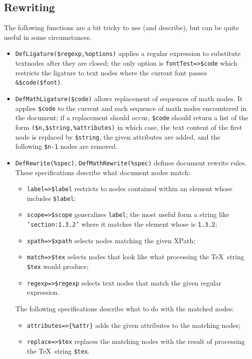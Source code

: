 \documentclass{book}
\begin{document}
\subsection{Rewriting}\label{customization.latexml.rewriting}
The following functions are a bit tricky to use (and describe),
but can be quite useful in some circumstances.
\begin{itemize}
\item \verb|DefLigature($regexp,%options)| applies a regular expression
to substitute textnodes after they are closed; the only option is \verb|fontTest=>$code|
which restricts the ligature to text nodes where the current font passes \verb|&$code($font)|.
\item \verb|DefMathLigature($code)| allows replacement of sequences of math nodes.
It applies \verb|$code| to the current 
and each sequence of math nodes encountered in the document; if a replacement should
occur, \verb|$code| should return a list of the form \verb|($n,$string,%attributes)|
in which case, the text content of the first node is replaced by \verb|$string|,
the given attributes are added, and the following \verb|$n-1| nodes are removed.
\item \verb|DefRewrite(%spec)|, \verb|DefMathRewrite(%spec)| defines document
rewrite rules. These specifications describe what document nodes match:
\begin{itemize}
\item \verb|label=>$label| restricts to nodes contained within an element whose
   includes \verb|$label|;
\item \verb|scope=>$scope| generalizes \texttt{label}; the most useful form
 a string like \texttt{'section:1.3.2'} where it matches the 
  element whose  is \texttt{1.3.2};
\item \verb|xpath=>$xpath| selects nodes matching the given XPath;
\item \verb|match=>$tex| selects nodes that look like what processing
 the \TeX\ string \verb|$tex| would produce;
\item \verb|regexp=>$regexp| selects text nodes that match the given regular expression.
\end{itemize}
The following specifications describe what to do with the matched nodes:
\begin{itemize}
\item \verb|attributes=>{%attr}| adds the given attributes to the matching nodes;
\item \verb|replace=>$tex| replaces the matching nodes with the result
of processing the \TeX\ string \verb|$tex|.
\end{itemize}
\end{itemize}
\end{document}
